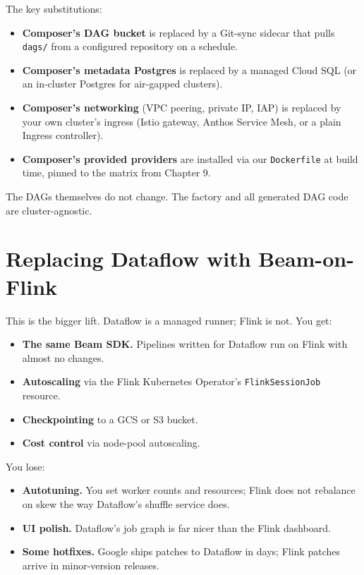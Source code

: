 \documentclass[
  11pt,
  british,
  oneside]{book}
\providecommand{\tightlist}{%
  \setlength{\itemsep}{0pt}\setlength{\parskip}{0pt}}
\begin{document}
The key substitutions:

\begin{itemize}
\tightlist
\item
  \textbf{Composer's DAG bucket} is replaced by a Git-sync sidecar that
  pulls \texttt{dags/} from a configured repository on a schedule.
\item
  \textbf{Composer's metadata Postgres} is replaced by a managed Cloud
  SQL (or an in-cluster Postgres for air-gapped clusters).
\item
  \textbf{Composer's networking} (VPC peering, private IP, IAP) is
  replaced by your own cluster's ingress (Istio gateway, Anthos Service
  Mesh, or a plain Ingress controller).
\item
  \textbf{Composer's provided providers} are installed via our
  \texttt{Dockerfile} at build time, pinned to the matrix from Chapter
  9.
\end{itemize}

The DAGs themselves do not change. The factory and all generated DAG
code are cluster-agnostic.

\hypertarget{replacing-dataflow-with-beam-on-flink}{%
\section{Replacing Dataflow with
Beam-on-Flink}\label{replacing-dataflow-with-beam-on-flink}}

This is the bigger lift. Dataflow is a managed runner; Flink is not. You
get:

\begin{itemize}
\tightlist
\item
  \textbf{The same Beam SDK.} Pipelines written for Dataflow run on
  Flink with almost no changes.
\item
  \textbf{Autoscaling} via the Flink Kubernetes Operator's
  \texttt{FlinkSessionJob} resource.
\item
  \textbf{Checkpointing} to a GCS or S3 bucket.
\item
  \textbf{Cost control} via node-pool autoscaling.
\end{itemize}

You lose:

\begin{itemize}
\tightlist
\item
  \textbf{Autotuning.} You set worker counts and resources; Flink does
  not rebalance on skew the way Dataflow's shuffle service does.
\item
  \textbf{UI polish.} Dataflow's job graph is far nicer than the Flink
  dashboard.
\item
  \textbf{Some hotfixes.} Google ships patches to Dataflow in days;
  Flink patches arrive in minor-version releases.
\end{itemize}
\end{document}
